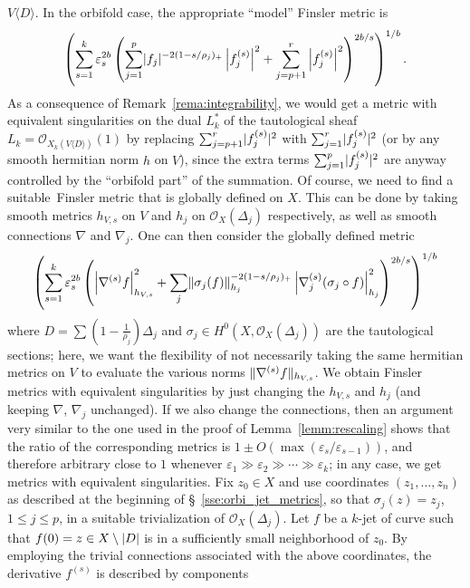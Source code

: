 \documentclass[AHL,Unicode,longabstracts,published]{cedram}
\DeclarePairedDelimiter{\abs}{\lvert}{\rvert}
\DeclarePairedDelimiter{\Abs}{\lVert}{\rVert}
\newcommand*\cO{\mathcal{O}}
\let\leq\leqslant
\begin{document}
$V\langle D\rangle$. In the orbifold case, the appropriate ``model'' Finsler metric is
\[
\left(
\sum_{s=1}^k\varepsilon_s^{2b}
\left(
\sum_{j=1}^p
\abs{f_j}^{-2(1-s/\rho_j)_+}\left|f_j^{(s)}\right|^2 +
\sum_{j=p+1}^r
\left|f_j^{(s)}\right|^2
\right)^{2b/s}
\right)^{1/b}.
\]
As a consequence of Remark~\ref{rema:integrability}, we would get a metric with equivalent singularities on the dual $L_k^*$ of the tautological sheaf
$L_k=\cO_{X_k(V\langle D\rangle)}(1)$ by replacing
$\sum_{j=p+1}^r\abs{f_j^{(s)}}^2$ with $\sum_{j=1}^r\abs{f_j^{(s)}}^2$ (or by any smooth hermitian norm $h$ on $V$), since the extra terms
$\sum_{j=1}^p\abs{f_j^{(s)}}^2$ are anyway controlled by the ``orbifold part'' of the summation. Of course, we need to find a suitable~Finsler metric that is globally defined on $X$. This can be done by taking smooth metrics $h_{V,s}$ on $V$ and $h_j$ on $\cO_X(\Delta_j)$ respectively, as well as smooth connections $\nabla$ and $\nabla_j$. One can then consider the globally defined metric
\begin{equation}\label{eq:orbi_Finsler}
\left(\sum_{s=1}^k\varepsilon_s^{2b}\left(\left|\nabla^{(s)}f\right|_{h_{V,s}}^2 +\sum_j\Abs{\sigma_j(f)}_{h_j}^{-2(1-s/\rho_j)_+}
\left|\nabla_j^{(s)}(\sigma_j\circ f)\right|_{h_j}^2\right)^{2b/s}\right)^{1/b}
\end{equation}
where $D=\sum(1-\tfrac{1}{\rho_j})\Delta_j$ and $\sigma_j\in H^0(X,\cO_X(\Delta_j))$ are the tautological sections; here, we want the flexibility of not necessarily taking the same hermitian metrics on $V$ to evaluate the various norms $\Abs{\nabla^{(s)}f}_{h_{V,s}}$. We obtain Finsler metrics with equivalent singularities by just changing the $h_{V,s}$ and $h_j$ (and keeping $\nabla$, $\nabla_j$ unchanged). If we also change the connections, then an argument very similar to the one used in the proof of Lemma~\ref{lemm:rescaling} shows that the ratio of the corresponding metrics is
$1\pm O(\max(\varepsilon_s/\varepsilon_{s-1}))$, and therefore arbitrary close to $1$ whenever $\varepsilon_1\gg\varepsilon_2\gg \cdots\gg\varepsilon_k$; in any case, we get metrics with equivalent singularities. Fix $z_0\in X$ and use coordinates $(z_1,\dotsc,z_n)$ as described at the beginning of \S~\ref{sse:orbi_jet_metrics}, so that $\sigma_j(z)=z_j$, $1\leq j\leq p$, in a suitable trivialization of $\cO_X(\Delta_j)$. Let $f$ be a $k$-jet of curve such that $f(0)=z\in X\setminus\abs{D}$ is in a sufficiently small neighborhood of $z_0$. By employing the trivial connections associated with the above coordinates, the derivative $f^{(s)}$ is described by components
\end{document}
